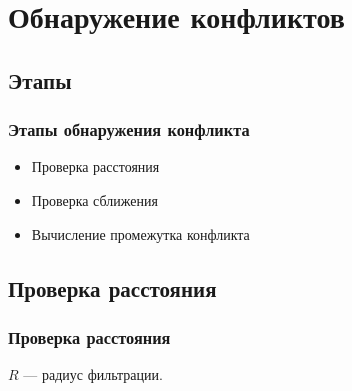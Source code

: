 \documentclass[10pt,t]{beamer}
\begin{document}
\section[Обнаружение конфликтов]{Обнаружение конфликтов}
\subsection[Этапы]{Этапы}
\begin{frame}
\frametitle{Этапы обнаружения конфликта}
\small


\begin{itemize}
	\item Проверка расстояния 
	\item Проверка сближения
	\item Вычисление промежутка конфликта
\end{itemize}

\end{frame}
\subsection[Проверка расстояния]{Проверка расстояния}
\begin{frame}
\frametitle{Проверка расстояния}
\small

\begin{center}
\end{center}

$R$ --- радиус фильтрации.
\end{frame}

\end{document}
